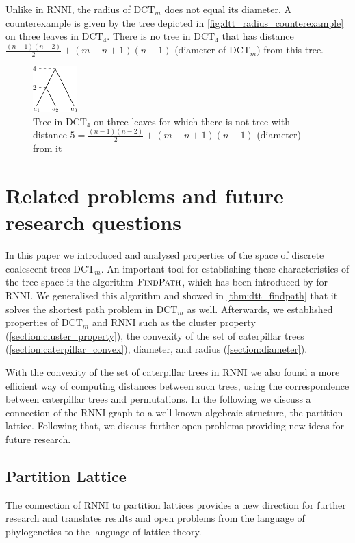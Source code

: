 \documentclass[11pt]{amsart}
\newcommand{\rnni}{\mathrm{RNNI}}
\newcommand{\findpath}{\textsc{FindPath}}
\newcommand{\dtt}{\mathrm{DCT}}
\begin{document}
Unlike in $\rnni$, the radius of $\dtt_m$ does not equal its diameter.
A counterexample is given by the tree depicted in \autoref{fig:dtt_radius_counterexample} on three leaves in $\dtt_4$.
There is no tree in $\dtt_4$ that has distance $\frac{(n-1)(n-2)}{2} + (m-n+1)(n-1)$ (diameter of $\dtt_m$) from this tree.

\begin{figure}[ht]
	\includegraphics[width=0.15\textwidth]{dtt_radius_counterexample.eps}
	\caption{Tree in $\dtt_4$ on three leaves for which there is not tree with distance $5 = \frac{(n-1)(n-2)}{2} + (m-n+1)(n-1)$ (diameter) from it}
	\label{fig:dtt_radius_counterexample}
\end{figure}


\section{Related problems and future research questions}
\label{section:open_problems}

In this paper we introduced and analysed properties of the space of discrete coalescent trees $\dtt_m$.
An important tool for establishing these characteristics of the tree space is the algorithm $\findpath$, which has been introduced by \textcite{Collienne2020-iu} for $\rnni$.
We generalised this algorithm and showed in \autoref{thm:dtt_findpath} that it solves the shortest path problem in $\dtt_m$ as well.
Afterwards, we established properties of $\dtt_m$ and $\rnni$ such as the cluster property (\autoref{section:cluster_property}), the convexity of the set of caterpillar trees (\autoref{section:caterpillar_convex}), diameter, and radius (\autoref{section:diameter}).

With the convexity of the set of caterpillar trees in $\rnni$ we also found a more efficient way of computing distances between such trees, using the correspondence between caterpillar trees and permutations.
In the following we discuss a connection of the $\rnni$ graph to a well-known algebraic structure, the partition lattice.
Following that, we discuss further open problems providing new ideas for future research.

\subsection{Partition Lattice}
The connection of $\rnni$ to partition lattices provides a new direction for further research and translates results and open problems from the language of phylogenetics to the language of lattice theory.
\end{document}
